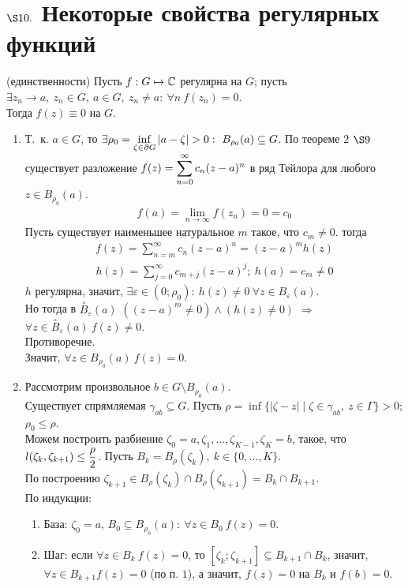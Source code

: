 \section{$\S 10.$ Некоторые свойства регулярных функций}
\theorem (единственности)
Пусть $f: G \mapsto \mathbb{C}$ регулярна на $G$; пусть $\exists z_n \to a, \ z_n \in
G, \ a \in G, \ z_n \neq a: \ \forall n \ f(z_n) = 0$.
\\
Тогда $f(z) \equiv 0$ на $G$.
\pr
~
\begin{enumerate}
    \item Т.~к. $a \in G$, то $\exists \rho_0 = \displaystyle \inf_{\zeta \in \partial
      G}\left| a-\zeta \right| > 0: \ B_{\rho_0}(a) \subseteq G $. По теореме
    $2$ $\S 9$ существует разложение $f(z) = \displaystyle \sum_{n=0}^{\infty}c_n(z-a)^n$
    в ряд Тейлора для любого $z \in B_{\rho_0}(a)$.
    \begin{align*}
      f(a) = \lim_{n \to \infty} f(z_n) = 0 = c_0
    \end{align*}
    Пусть существует наименьшее натуральное $m$ такое, что $c_m \neq 0$. тогда
    \begin{align*}
      f(z) = \sum_{n=m}^{\infty}c_n(z-a)^n = (z-a)^mh(z)
    \end{align*}
    \begin{align*}
      h(z) = \sum_{j=0}^{\infty}c_{m+j}(z-a)^j; \ h(a) = c_m \neq 0
    \end{align*}
    $h$ регулярна, значит, $\exists \varepsilon \in (0; \rho_0): \ h(z) \neq 0
    \ \forall z \in B_{\varepsilon}(a)$.
    \\
    Но тогда в $\overset{\circ}{B}_{\varepsilon}(a)$ $((z-a)^m \neq 0) \wedge
    (h(z) \neq 0)$ $\Rightarrow$ $\forall z \in
    \overset{\circ}{B}_{\varepsilon}(a) \ f(z) \neq 0$.
    \\
    Противоречие.
    \\
    Значит, $\forall z \in B_{\rho_0}(a) \ f(z) = 0$.
    \item Рассмотрим произвольное $b \in G \setminus B_{\rho_0}(a)$.
    \\
    Существует спрямляемая $\gamma_{ab} \subseteq G$. Пусть $\rho = \inf\{\left|
        \zeta - z \right| \mid \zeta \in \gamma_{ab}, \ z \in \Gamma\} > 0$;
    $\rho_0 \leq \rho$.
    \\
    Можем построить разбиение $\zeta_0 = a, \zeta_1, \dots, \zeta_{K-1}, \zeta_K
    = b$, такое, что $l(\zeta_k, \zeta_{k+1}) \leq \displaystyle \frac{\rho}{2}$. Пусть
    $B_k = B_{\rho}(\zeta_k), \ k \in \{0, \dots, K\}$.
    \\
    По построению $\zeta_{k+1}\in B_{\rho}(\zeta_k) \cap B_{\rho}(\zeta_{k+1}) =
    B_k \cap B_{k+1}$.
    \\
    По индукции:
    \begin{enumerate}
        \item База: $\zeta_0 = a$, $B_0 \subseteq B_{\rho_0}(a): \ \forall z \in
        B_0 \ f(z) = 0$.
        \item Шаг: если $\forall z \in B_k \ f(z) = 0$, то $[\zeta_k;
        \zeta_{k+1}]\subseteq B_{k+1}\cap B_{k}$, значит, $\forall z \in B_{k+1}
        f(z) = 0$ (по п. $1$), а значит, $f(z) = 0$ на $B_k$ и $f(b) = 0 $.
    \end{enumerate}
\end{enumerate}
